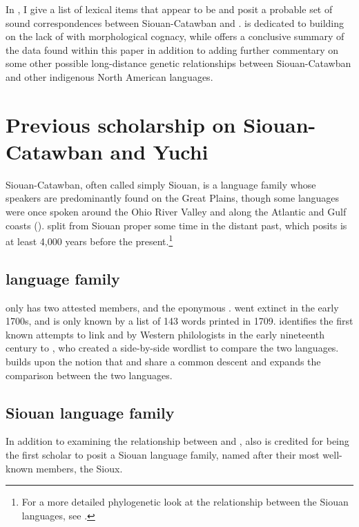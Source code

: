 \documentclass[output=paper]{LSP/langsci}
\begin{document}
In , I give a list of lexical items that appear to be  and posit a probable set of sound correspondences between Siouan-Catawban and .  is dedicated to building on the lack of  with morphological cognacy, while  offers a conclusive summary of the data found within this paper in addition to adding further commentary on some other possible long-distance genetic relationships between Siouan-Catawban and other indigenous North American languages.

\section{Previous scholarship on Siouan-Catawban and Yuchi}\label{sec:kasak:2}

Siouan-Catawban, often called simply Siouan, is a language family whose speakers are predominantly found on the Great Plains, though some languages were once spoken around the Ohio River Valley and along the Atlantic and Gulf coasts (\citealt{Mithun1999}).  split from Siouan proper some time in the distant past, which \citet{Rankin1996} posits is at least 4,000 years before the present.\footnote{For a more detailed phylogenetic look at the relationship between the Siouan languages, see \citet{Rankin2010}.}

\subsection{ language family}

 only has two attested members,  and the eponymous .  went extinct in the early 1700s, and is only known by a list of 143 words printed in 1709. \citet{Carter1980} identifies the first known attempts to link  and  by Western philologists in the early nineteenth century to  \citet{AdelungVater1816}, who created a side-by-side wordlist to compare the two languages. \citet{Gallatin1836} builds upon the notion that  and  share a common descent and expands the comparison between the two languages.

\subsection{Siouan language family}

In addition to examining the relationship between  and , \citet{Gallatin1836} also is credited for being the first scholar to posit a Siouan language family, named after their most well-known members, the Sioux. 
\end{document}
